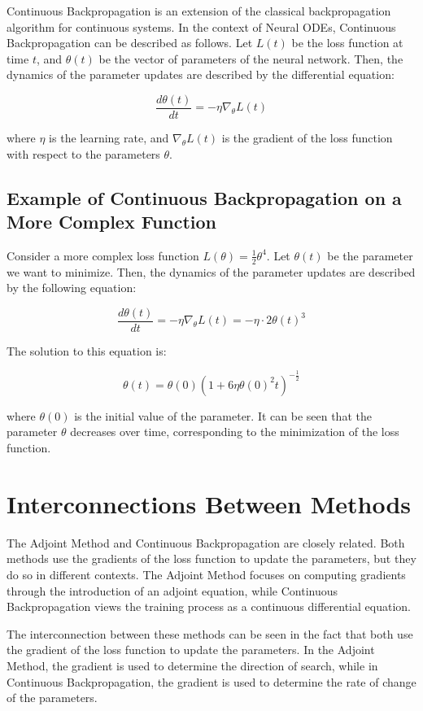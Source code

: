\documentclass[a4paper,12pt]{article}
\theoremstyle{plain} %
\theoremstyle{definition} %
\theoremstyle{remark} %
\begin{document}
Continuous Backpropagation is an extension of the classical backpropagation algorithm for continuous systems. In the context of Neural ODEs, Continuous Backpropagation can be described as follows. Let \( L(t) \) be the loss function at time \( t \), and \( \theta(t) \) be the vector of parameters of the neural network. Then, the dynamics of the parameter updates are described by the differential equation:

\[ \frac{d\theta(t)}{dt} = -\eta \nabla_\theta L(t) \]

where \( \eta \) is the learning rate, and \( \nabla_\theta L(t) \) is the gradient of the loss function with respect to the parameters \( \theta \).

\subsection{Example of Continuous Backpropagation on a More Complex Function}

Consider a more complex loss function \( L(\theta) = \frac{1}{2} \theta^4 \). Let \( \theta(t) \) be the parameter we want to minimize. Then, the dynamics of the parameter updates are described by the following equation:

\[ \frac{d\theta(t)}{dt} = -\eta \nabla_\theta L(t) = -\eta \cdot 2\theta(t)^3 \]

The solution to this equation is:

\[ \theta(t) = \theta(0) \left(1 + 6\eta \theta(0)^2 t\right)^{-\frac{1}{2}} \]

where \( \theta(0) \) is the initial value of the parameter. It can be seen that the parameter \( \theta \) decreases over time, corresponding to the minimization of the loss function.

\section{Interconnections Between Methods}

The Adjoint Method and Continuous Backpropagation are closely related. Both methods use the gradients of the loss function to update the parameters, but they do so in different contexts. The Adjoint Method focuses on computing gradients through the introduction of an adjoint equation, while Continuous Backpropagation views the training process as a continuous differential equation.

The interconnection between these methods can be seen in the fact that both use the gradient of the loss function to update the parameters. In the Adjoint Method, the gradient is used to determine the direction of search, while in Continuous Backpropagation, the gradient is used to determine the rate of change of the parameters.
\end{document}
